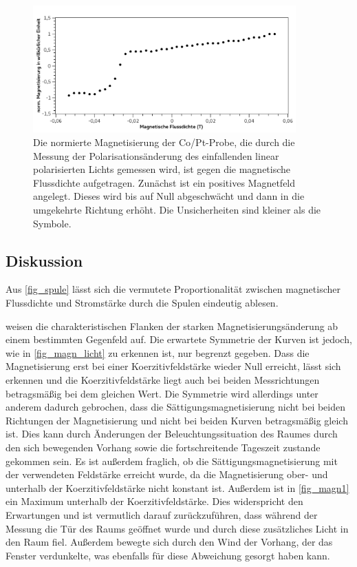 \documentclass[
	a4paper,
	12pt,
	pagesize,
	ngerman
]{scrartcl}
\begin{document}
	\begin{figure}[H] 
		\includegraphics[width=0.90\textwidth]{fig_magn2}
		\centering
		\caption{Die normierte Magnetisierung der Co/Pt-Probe, die durch die Messung der Polarisationsänderung des einfallenden linear polarisierten Lichts gemessen wird, ist gegen die magnetische Flussdichte aufgetragen. 
		Zunächst ist ein positives Magnetfeld angelegt. 
		Dieses wird bis auf Null abgeschwächt und dann in die umgekehrte Richtung erhöht.
		Die Unsicherheiten sind kleiner als die Symbole.} 
		\label{fig_magn2}
		\centering
	\end{figure}
	\subsection{Diskussion}

	Aus \cref{fig_spule} lässt sich die vermutete Proportionalität zwischen magnetischer Flussdichte und Stromstärke durch die Spulen eindeutig ablesen.
	
	 weisen die charakteristischen Flanken der starken Magnetisierungsänderung ab einem bestimmten Gegenfeld auf.
	Die erwartete Symmetrie der Kurven ist jedoch, wie in \cref{fig_magn_licht} zu erkennen ist, nur begrenzt gegeben.
	Dass die Magnetisierung erst bei einer Koerzitivfeldstärke wieder Null erreicht, lässt sich erkennen und die Koerzitivfeldstärke liegt auch bei beiden Messrichtungen betragsmäßig bei dem gleichen Wert.
	Die Symmetrie wird allerdings unter anderem dadurch gebrochen, dass die Sättigungsmagnetisierung nicht bei beiden Richtungen der Magnetisierung und nicht bei beiden Kurven betragsmäßig gleich ist.
	Dies kann durch Änderungen der Beleuchtungssituation des Raumes durch den sich bewegenden Vorhang sowie die fortschreitende Tageszeit zustande gekommen sein.
	Es ist außerdem fraglich, ob die Sättigungsmagnetisierung mit der verwendeten Feldstärke erreicht wurde, da die Magnetisierung ober- und unterhalb der Koerzitivfeldstärke nicht konstant ist.
	Außerdem ist in \cref{fig_magn1} ein Maximum unterhalb der Koerzitivfeldstärke.
	Dies widerspricht den Erwartungen und ist vermutlich darauf zurückzuführen, dass während der Messung die Tür des Raums geöffnet wurde und durch diese zusätzliches Licht in den Raum fiel.
	Außerdem bewegte sich durch den Wind der Vorhang, der das Fenster verdunkelte, was ebenfalls für diese Abweichung gesorgt haben kann.
	
\end{document}
